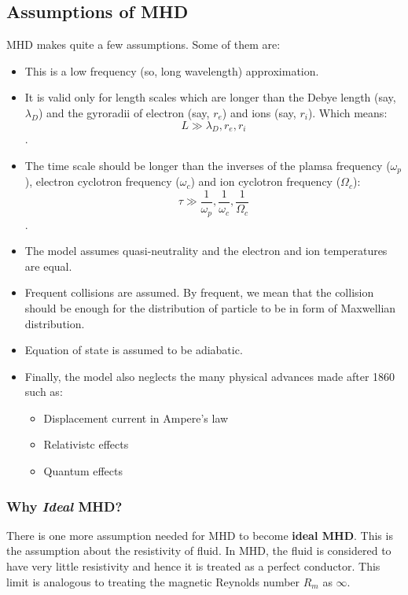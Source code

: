 \documentclass[12pt]{article}
\newenvironment{changemargin}[2]{
\begin{list}{}{
\setlength{\topsep}{0pt}
\setlength{\leftmargin}{#1}
\setlength{\rightmargin}{#2}
\setlength{\listparindent}{\parindent}
\setlength{\itemindent}{\parindent}
\setlength{\parsep}{\parskip}
}
\item[]}{\end{list}}
\begin{document}
\begin{changemargin}{-2cm}{-2cm}
    \subsection{Assumptions of MHD}
    MHD makes quite a few assumptions. Some of them are\cite{article1}:
    \begin{itemize}
        \item This is a low frequency (so, long wavelength)  approximation.
        \item It is valid only for length scales which are longer than the Debye length (say, $\lambda_D$) and the gyroradii of electron (say, $r_e$) and ions (say, $r_i$). Which means: $$ L \gg \lambda_D, r_e, r_i$$.
        \item The time scale should be longer than the inverses of the plamsa frequency ($\omega_p$), electron cyclotron frequency ($\omega_c$) and ion cyclotron frequency ($\Omega_{c}$): $$\tau \gg \frac{1}{\omega_p}, \frac{1}{\omega_c}, \frac{1}{\Omega_{c}}$$.
        \item The model assumes quasi-neutrality and the electron and ion temperatures are equal.
        \item Frequent collisions are assumed. By frequent, we mean that the collision should be enough for the distribution of particle  to be in form of Maxwellian distribution.
        \item Equation of state is assumed to be adiabatic.
        \item Finally, the model also neglects the many physical advances made after 1860 such as:
              \begin{itemize}
                  \item Displacement current in Ampere's law
                  \item Relativistc effects
                  \item Quantum effects
              \end{itemize}
    \end{itemize}

    \subsubsection{Why \textit{Ideal} MHD?}
    There is one more assumption needed for MHD to become \textbf{ideal MHD}. This is the assumption about the resistivity of fluid. In MHD, the fluid is considered to have very little resistivity and hence it is treated as a perfect conductor. This limit is analogous to treating the magnetic Reynolds number $R_m$ as $\infty$.


\end{changemargin}
\end{document}
